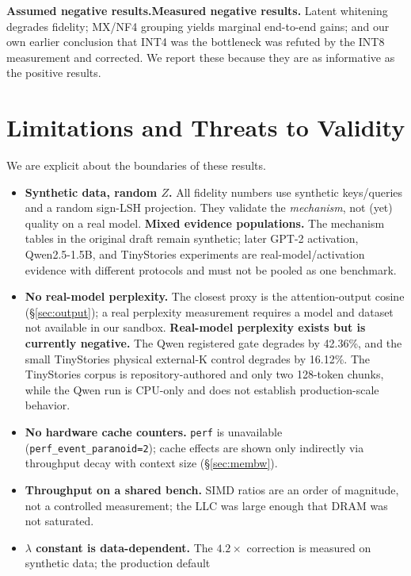 \documentclass[11pt]{article}
\newcommand{\added}[1]{\textcolor{revisionblue}{#1}}
\newcommand{\deleted}[1]{\textcolor{revisionred}{#1}}
\theoremstyle{plain}
\theoremstyle{definition}
\begin{document}
\noindent\deleted{\textbf{Assumed negative results.}}\added{\textbf{Measured negative results.}}
Latent whitening degrades
fidelity; MX/NF4 grouping yields marginal end-to-end gains; and our own
earlier conclusion that INT4 was the bottleneck was refuted by the INT8
measurement and corrected. We report these because they are as
informative as the positive results.

\section{Limitations and Threats to Validity}
\label{sec:limits}
We are explicit about the boundaries of these results.

\begin{itemize}[leftmargin=1.4em,itemsep=2pt]
  \item \deleted{\textbf{Synthetic data, random $Z$.} All fidelity numbers use
    synthetic keys/queries and a random sign-LSH projection. They
    validate the \emph{mechanism}, not (yet) quality on a real model.}
    \added{\textbf{Mixed evidence populations.} The mechanism tables in the
    original draft remain synthetic; later GPT-2 activation, Qwen2.5-1.5B,
    and TinyStories experiments are real-model/activation evidence with
    different protocols and must not be pooled as one benchmark.}
  \item \deleted{\textbf{No real-model perplexity.} The closest proxy is the
    attention-output cosine (\S\ref{sec:output}); a real perplexity
    measurement requires a model and dataset not available in our sandbox.}
    \added{\textbf{Real-model perplexity exists but is currently negative.}
    The Qwen registered gate degrades by 42.36\%, and the small TinyStories
    physical external-K control degrades by 16.12\%. The TinyStories corpus
    is repository-authored and only two 128-token chunks, while the Qwen run
    is CPU-only and does not establish production-scale behavior.}
  \item \textbf{No hardware cache counters.} \texttt{perf} is
    unavailable (\texttt{perf\_event\_paranoid=2}); cache effects are
    shown only indirectly via throughput decay with context size
    (\S\ref{sec:membw}).
  \item \textbf{Throughput on a shared bench.} SIMD ratios are an order
    of magnitude, not a controlled measurement; the LLC was large enough
    that DRAM was not saturated.
  \item \textbf{$\lambda$ constant is data-dependent.} The $4.2\times$
    correction is measured on synthetic data; the production default

\end{itemize}
\end{document}
